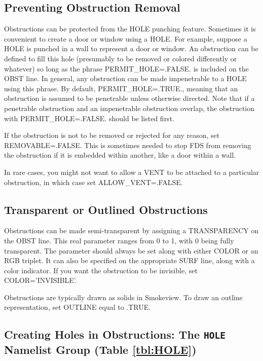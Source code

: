 \documentclass[11pt]{book}
\begin{document}
\subsection{Preventing Obstruction Removal}

Obstructions can be protected from the {\ct HOLE} punching feature. Sometimes it is convenient to create a door or window using a {\ct HOLE}. For example, suppose a {\ct HOLE} is punched in a wall to represent a door or window. An obstruction can be defined to fill this hole (presumably to be removed or colored differently or whatever) so long as the phrase {\ct PERMIT\_HOLE=.FALSE.} is included on the {\ct OBST} line. In general, any obstruction can be made impenetrable to a {\ct HOLE} using this phrase. By default, {\ct PERMIT\_HOLE=.TRUE.}, meaning that an obstruction is assumed to be penetrable unless otherwise directed. Note that if a penetrable  obstruction and an impenetrable  obstruction overlap, the obstruction with {\ct PERMIT\_HOLE=.FALSE.} should be listed first.

If the obstruction is not to be removed or rejected for any reason, set {\ct REMOVABLE=.FALSE.} This is sometimes needed to stop
FDS from removing the obstruction if it is embedded within another, like a door within a wall.

In rare cases, you might not want to allow a {\ct VENT} to be attached to a particular obstruction, in which case set {\ct ALLOW\_VENT=.FALSE.}

\subsection{Transparent or Outlined Obstructions}

Obstructions can be made semi-transparent by assigning a {\ct TRANSPARENCY} on the {\ct OBST} line. This real parameter ranges from 0 to 1, with 0 being fully transparent. The parameter should always be set along with either {\ct COLOR} or an {\ct RGB} triplet. It can also be specified on the appropriate {\ct SURF} line, along with a color indicator. If you want the obstruction to be invisible, set {\ct COLOR='INVISIBLE'}.

Obstructions are typically drawn as solids in Smokeview. To draw an outline representation, set {\ct OUTLINE} equal to {\ct .TRUE.}



\subsection{Creating Holes in Obstructions: The \texorpdfstring{{\tt HOLE}}{HOLE} Namelist Group (Table \ref{tbl:HOLE})}
\label{info:HOLE}
\end{document}
